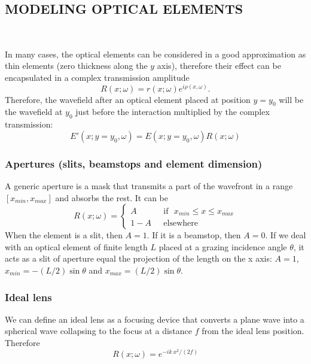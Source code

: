 \documentclass[]{spie}  %
\begin{document}
\subsection{MODELING OPTICAL ELEMENTS}\
\label{sec:elements}

In many cases, the optical elements can be considered in a good approximation as thin elements (zero thickness along the $y$ axis), therefore their effect can be encapsulated in a complex transmission amplitude 
\begin{equation}
    \label{eq:thinelement}
    R(x;\omega)=r(x;\omega) e^{i \rho(x,\omega)}.
\end{equation}
Therefore, the wavefield after an optical element placed at position $y=y_0$ will be the wavefield at $y_0$ just before the interaction multiplied by the complex transmission:
\begin{equation}
    E'(x;y=y_0,\omega) = E(x;y=y_0,\omega) R(x;\omega)
\end{equation}


\subsubsection{Apertures (slits, beamstops and element dimension)}
\label{sec:aperture}

A generic aperture is a mask that transmits a part of the wavefront in a range $[x_{min},x_{max}]$ and absorbs the rest. It can be
\begin{equation}
R(x;\omega) =
\left\{
\begin{matrix}
A  & \mbox{~~if~~} x_{min} \le x \le x_{max}
\\ 
1 - A & \mbox{~~elsewhere}
\end{matrix}
\right.
\end{equation}
When the element is a slit, then $A=1$. If it is a beamstop, then $A=0$. If we deal with an optical element of finite length $L$ placed at a grazing incidence angle $\theta$, it acts as a slit of aperture equal the projection of the length on the x axis: $A=1$, $x_{min}=-(L/2) \sin \theta$ and $x_{max}=(L/2) \sin \theta$. 

\subsubsection{Ideal lens}
\label{sec:idealLens}
We can define an ideal lens as a focusing device that converts a plane wave into a spherical wave collapsing to the focus at a distance $f$ from the ideal lens position. Therefore
\begin{equation}
    R(x;\omega) = e^{-i k~x^2/(2 f)}
\end{equation}
\end{document}
